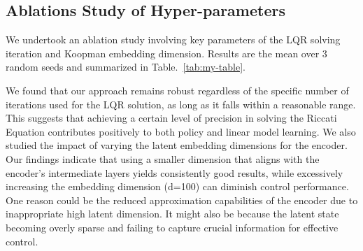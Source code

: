 \subsection*{Ablations Study of Hyper-parameters}
We undertook an ablation study involving key parameters of the LQR solving iteration and Koopman embedding dimension. Results are the mean over 3 random seeds and summarized in  Table.~\ref{tab:my-table}.

We found that our approach remains robust regardless of the specific number of iterations used for the LQR solution, as long as it falls within a reasonable range. This suggests that achieving a certain level of precision in solving the Riccati Equation contributes positively to both policy and linear model learning. We also studied the impact of varying the latent embedding dimensions for the encoder. Our findings indicate that using a smaller dimension that aligns with the encoder's intermediate layers yields consistently good results, while excessively increasing the embedding dimension (d=100) can diminish control performance. One reason could be the reduced approximation capabilities of the encoder due to inappropriate high latent dimension. It might also be because the latent state becoming overly sparse 
and failing to capture crucial information for effective control.

